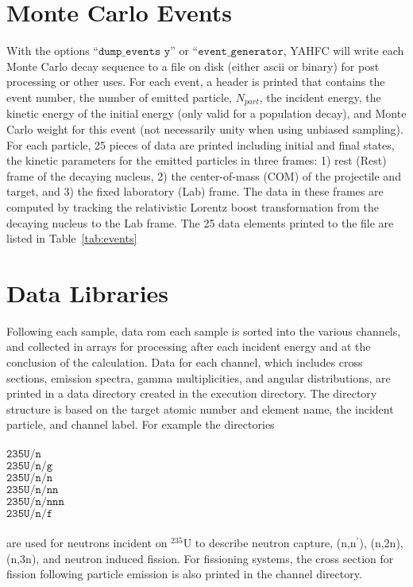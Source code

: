 \documentclass[
10pt,
showpacs,preprintnumbers,footinbib,
amsfonts,amsmath,amssymb,
aps,
prc,twocolumn,groupedaddress,superscriptaddress,
showkeys,
nofootinbib
]{revtex4-1}
\begin{document}
\section{Monte Carlo Events}

With the options ``${\texttt{dump\_events y}}$'' or ``${\texttt{event\_generator}}$, YAHFC will write each Monte Carlo decay sequence to a file on disk (either ascii or binary) for post processing or other uses. For each event, a header is printed that contains the event number, the number of emitted particle, $N_{part}$, the incident energy, the kinetic energy of the initial energy (only valid for a population decay), and Monte Carlo weight for this event (not necessarily unity when using unbiased sampling). For each particle, 25 pieces of data are printed including initial and final states, the kinetic parameters for the emitted particles in three frames: 1) rest (Rest) frame of the decaying nucleus, 2) the center-of-mass (COM) of the projectile and target, and 3) the fixed laboratory (Lab) frame. The data in these frames are computed by tracking the relativistic Lorentz boost transformation from the decaying nucleus to the Lab frame. The 25 data elements printed to the file are listed in Table~\ref{tab:events}

\section{Data Libraries}
\label{sec:Libraries}
Following each sample, data rom each sample is sorted into the various channels, and collected in arrays for processing after each incident energy and at the conclusion of the calculation. Data for each channel, which includes cross sections, emission spectra, gamma multiplicities, and angular distributions, are printed in a data directory created in the execution directory. The directory structure is based on the target atomic number and element name, the incident particle, and channel label. For example the directories\\
\\
${\texttt{235U/n}}$\\
${\texttt{235U/n/g}}$\\
${\texttt{235U/n/n}}$\\
${\texttt{235U/n/nn}}$\\
${\texttt{235U/n/nnn}}$\\
${\texttt{235U/n/f}}$\\
\\
are used for neutrons incident on $^{235}$U to describe neutron capture, (n,n$^\prime$), (n,2n), (n,3n), and neutron induced fission. For fissioning systems, the cross section for fission following particle emission is also printed in the channel directory.
\end{document}
